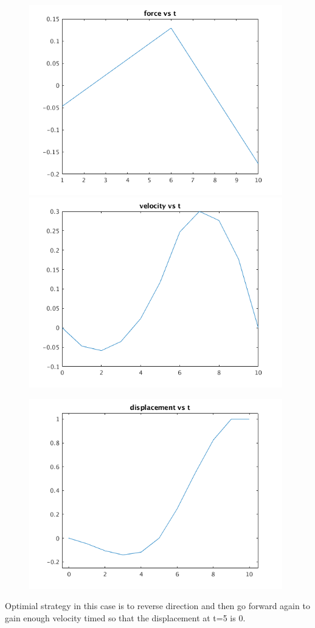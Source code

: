 \documentclass[12pt,letter]{article}
\begin{document}
\begin{enumerate}
\begin{itemize}
    \begin{figure}[H]
      \centering
      \includegraphics[width=11cm]{q9/part_b_plot_1.png}
      \includegraphics[width=11cm]{q9/part_b_plot_2.png}
    \end{figure}
    \begin{figure}[H]
      \centering
      \includegraphics[width=11cm]{q9/part_b_plot_3.png}
    \end{figure}
    Optimial strategy in this case is to reverse direction and then go forward again to gain enough velocity timed so that the displacement at t=5 is 0.\\
    

\end{itemize}
\end{enumerate}
\end{document}
